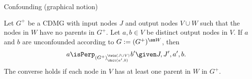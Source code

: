 \begin{frame}{Confounding (graphical notion)}
\begin{Prp}[\ref{prp:graph_unconfounded2}]
  Let $G^+$ be a CDMG with input nodes $J$ and output nodes $V \cup W$ such that the nodes in $W$ have no parents in $G^+$.
  Let $a,b \in V$ be distinct output nodes in $V$.
  If $a$ and $b$ are unconfounded according to $G := (G^+)^{\sm W}$, then
  $$a \isPerp_{(G^+)^{\twin(J \cup V)}_{\doit(a',b)}} b' \given J, J', a', b.$$
  The converse holds if each node in $V$ has at least one parent in $W$ in $G^+$.
\end{Prp}
\end{frame}

